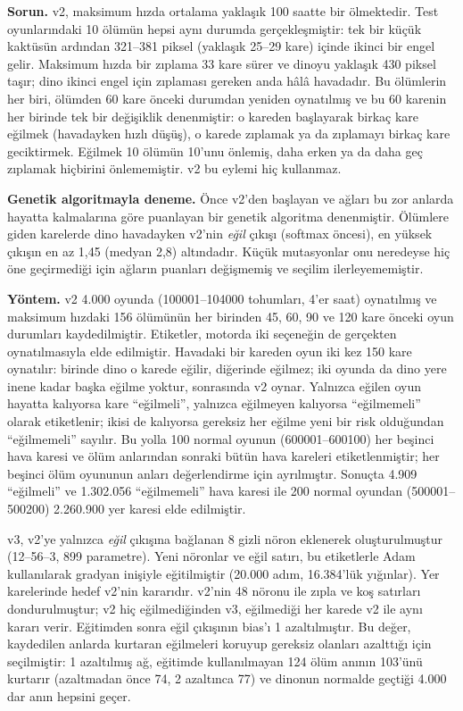 \documentclass[11pt,a4paper]{article}
\begin{document}
\textbf{Sorun.} v2, maksimum hızda ortalama yaklaşık 100 saatte bir ölmektedir. Test oyunlarındaki 10 ölümün hepsi aynı durumda gerçekleşmiştir: tek bir küçük kaktüsün ardından 321--381 piksel (yaklaşık 25--29 kare) içinde ikinci bir engel gelir. Maksimum hızda bir zıplama 33 kare sürer ve dinoyu yaklaşık 430 piksel taşır; dino ikinci engel için zıplaması gereken anda hâlâ havadadır. Bu ölümlerin her biri, ölümden 60 kare önceki durumdan yeniden oynatılmış ve bu 60 karenin her birinde tek bir değişiklik denenmiştir: o kareden başlayarak birkaç kare eğilmek (havadayken hızlı düşüş), o karede zıplamak ya da zıplamayı birkaç kare geciktirmek. Eğilmek 10 ölümün 10'unu önlemiş, daha erken ya da daha geç zıplamak hiçbirini önlememiştir. v2 bu eylemi hiç kullanmaz.

\textbf{Genetik algoritmayla deneme.} Önce v2'den başlayan ve ağları bu zor anlarda hayatta kalmalarına göre puanlayan bir genetik algoritma denenmiştir. Ölümlere giden karelerde dino havadayken v2'nin \emph{eğil} çıkışı (softmax öncesi), en yüksek çıkışın en az 1,45 (medyan 2,8) altındadır. Küçük mutasyonlar onu neredeyse hiç öne geçirmediği için ağların puanları değişmemiş ve seçilim ilerleyememiştir.

\textbf{Yöntem.} v2 4.000 oyunda (100001--104000 tohumları, 4'er saat) oynatılmış ve maksimum hızdaki 156 ölümünün her birinden 45, 60, 90 ve 120 kare önceki oyun durumları kaydedilmiştir. Etiketler, motorda iki seçeneğin de gerçekten oynatılmasıyla elde edilmiştir. Havadaki bir kareden oyun iki kez 150 kare oynatılır: birinde dino o karede eğilir, diğerinde eğilmez; iki oyunda da dino yere inene kadar başka eğilme yoktur, sonrasında v2 oynar. Yalnızca eğilen oyun hayatta kalıyorsa kare ``eğilmeli'', yalnızca eğilmeyen kalıyorsa ``eğilmemeli'' olarak etiketlenir; ikisi de kalıyorsa gereksiz her eğilme yeni bir risk olduğundan ``eğilmemeli'' sayılır. Bu yolla 100 normal oyunun (600001--600100) her beşinci hava karesi ve ölüm anlarından sonraki bütün hava kareleri etiketlenmiştir; her beşinci ölüm oyununun anları değerlendirme için ayrılmıştır. Sonuçta 4.909 ``eğilmeli'' ve 1.302.056 ``eğilmemeli'' hava karesi ile 200 normal oyundan (500001--500200) 2.260.900 yer karesi elde edilmiştir.

v3, v2'ye yalnızca \emph{eğil} çıkışına bağlanan 8 gizli nöron eklenerek oluşturulmuştur (12--56--3, 899 parametre). Yeni nöronlar ve eğil satırı, bu etiketlerle Adam \cite{kingma2015} kullanılarak gradyan inişiyle eğitilmiştir (20.000 adım, 16.384'lük yığınlar). Yer karelerinde hedef v2'nin kararıdır. v2'nin 48 nöronu ile zıpla ve koş satırları dondurulmuştur; v2 hiç eğilmediğinden v3, eğilmediği her karede v2 ile aynı kararı verir. Eğitimden sonra eğil çıkışının bias'ı 1 azaltılmıştır. Bu değer, kaydedilen anlarda kurtaran eğilmeleri koruyup gereksiz olanları azalttığı için seçilmiştir: 1 azaltılmış ağ, eğitimde kullanılmayan 124 ölüm anının 103'ünü kurtarır (azaltmadan önce 74, 2 azaltınca 77) ve dinonun normalde geçtiği 4.000 dar anın hepsini geçer.
\end{document}
